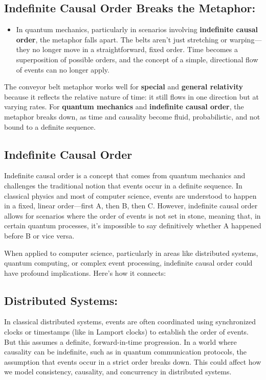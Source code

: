 \documentclass[../../../OAE-SPEC-MAIN.tex]{subfiles}
\begin{document}
\subsection*{Indefinite Causal Order Breaks the Metaphor:}

\begin{itemize}[leftmargin=1.5em]
\item In quantum mechanics, particularly in scenarios involving \textbf{indefinite causal order}, the metaphor falls apart. The belts aren’t just stretching or warping—they no longer move in a straightforward, fixed order. Time becomes a superposition of possible orders, and the concept of a simple, directional flow of events can no longer apply.
\end{itemize}

The conveyor belt metaphor works well for \textbf{special} and \textbf{general relativity} because it reflects the relative nature of time: it still flows in one direction but at varying rates. For \textbf{quantum mechanics} and \textbf{indefinite causal order}, the metaphor breaks down, as time and causality become fluid, probabilistic, and not bound to a definite sequence.

\subsection{Indefinite Causal Order}

Indefinite causal order is a concept that comes from quantum mechanics and challenges the traditional notion that events occur in a definite sequence. In classical physics and most of computer science, events are understood to happen in a fixed, linear order—first A, then B, then C. However, indefinite causal order allows for scenarios where the order of events is not set in stone, meaning that, in certain quantum processes, it’s impossible to say definitively whether A happened before B or vice versa.

When applied to computer science, particularly in areas like distributed systems, quantum computing, or complex event processing, indefinite causal order could have profound implications. Here's how it connects:

\subsection*{Distributed Systems:}

In classical distributed systems, events are often coordinated using synchronized clocks or timestamps (like in Lamport clocks) to establish the order of events. But this assumes a definite, forward-in-time progression. In a world where causality can be indefinite, such as in quantum communication protocols, the assumption that events occur in a strict order breaks down. This could affect how we model consistency, causality, and concurrency in distributed systems.
\end{document}
